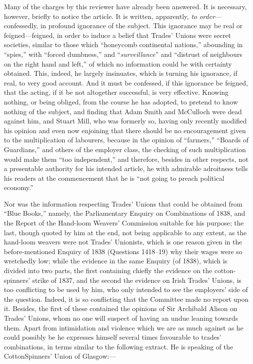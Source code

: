 Many of the charges by this reviewer have already been answered. It is
necessary, however, briefly to notice the article. It is written,
apparently, \textit{to order}---confessedly, in profound ignorance of
the subject. This ignorance may be real or feigned---feigned, in order
to induce a belief that Trades' Unions were secret societies, similar to
those which ``honeycomb continental nations,'' abounding in ``spies,''
with ``forced dumbness,'' and ``\textit{surveillance}'' and ``distrust
of neighbours on the right hand and left,'' of which no information
could be with certainty obtained. This, indeed, he largely insinuates,
which is turning his ignorance, if real, to very good account. And it
must be confessed, if this ignorance be feigned, that the acting, if it
be not altogether successful, is very effective. Knowing nothing, or
being obliged, from the course he has adopted, to pretend to know
nothing of the subject, and finding that Adam Smith and McCulloch were
dead against him, and Stuart Mill, who was formerly so, having only
recently modified his opinion and even now enjoining that there should
be no encouragement given to the multiplication of labourers, because in
the opinion of ``farmers,'' ``Boards of Guardians,'' and others of the
employer class, the checking of such multiplication would make them
``too independent,'' and therefore, besides in other respects, not a
presentable authority for his intended article, he with admirable
adroitness tells his readers at the commencement that he is ``not going
to preach political economy.''

Nor was the information respecting Trades' Unions that could be obtained
from ``Blue Books,'' namely, the Parliamentary Enquiry on Combinations of
1838, and the Report of the Hand-loom Weavers' Commission suitable for
his purpose; the last, though quoted by him at the end, not being
applicable to any extent, as the hand-loom weavers were not Trades'
Unionists, which is one reason given in the before-mentioned Enquiry of
1838 (Questions 1418--19) why their wages were so wretchedly low; while
the evidence in the same Enquiry (of 1838), which is divided into two
parts, the first containing chiefly the evidence on the cotton-spinners'
strike of 1837, and the second the evidence on Irish Trades' Unions, is
too conflicting to be used by him, who only intended to see the
employers' side of the question. Indeed, it is so conflicting that the
Committee made no report upon it. Besides, the first of these contained
the opinions of Sir Archibald Alison on Trades' Unions, whom no one will
suspect of having an undue leaning towards them. Apart from intimidation
and violence which we are as much against as he could possibly be he
expresses himself several times favourable to trades' combinations, in
terms similar to the following extract. He is speaking of the
CottonSpinners' Union of Glasgow:---

